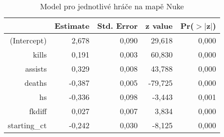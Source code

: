 \begin{table}[H]
\centering
\begin{tabular}{rrrrr}
  \hline
 & Estimate & Std. Error & z value & Pr($>$$|$z$|$) \\ 
  \hline
(Intercept) & 2,678 & 0,090 & 29,618 & 0,000 \\ 
  kills & 0,191 & 0,003 & 60,830 & 0,000 \\ 
  assists & 0,329 & 0,008 & 43,788 & 0,000 \\ 
  deaths & -0,387 & 0,005 & -79,725 & 0,000 \\ 
  hs & -0,336 & 0,098 & -3,443 & 0,001 \\ 
  fkdiff & 0,027 & 0,007 & 3,834 & 0,000 \\ 
  starting\_ct & -0,242 & 0,030 & -8,125 & 0,000 \\ 
   \hline
\end{tabular}
\caption{\label{tab:player_model_Nuke}Model pro jednotlivé hráče na mapě Nuke} 
\end{table}
